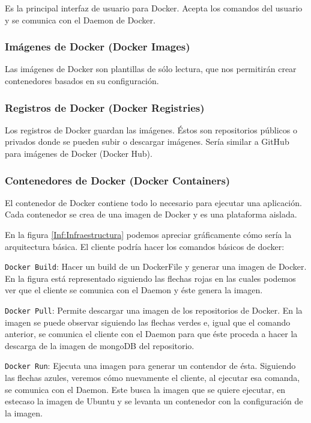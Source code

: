 Es la principal interfaz de usuario para Docker. Acepta los comandos del usuario y se
comunica con el Daemon de Docker.

\subsubsection{Imágenes de Docker (Docker Images)}

Las imágenes de Docker son plantillas de sólo lectura, que nos permitirán crear contenedores basados en su configuración.

\subsubsection{Registros de Docker (Docker Registries)}

Los registros de Docker guardan las imágenes. Éstos son repositorios públicos o privados donde se pueden subir o descargar imágenes. Sería similar a GitHub para imágenes de Docker (Docker Hub).

\subsubsection{Contenedores de Docker (Docker Containers)}

El contenedor de Docker contiene todo lo necesario para ejecutar una aplicación. Cada contenedor se crea de una imagen de Docker y es una plataforma aislada.
\newline

En la figura \ref{Inf:Infraestructura} podemos apreciar gráficamente cómo sería la arquitectura básica. El cliente podría hacer los comandos básicos de docker:

\texttt{Docker Build}: Hacer un build de un DockerFile y generar una imagen de Docker. En la figura está representado siguiendo las flechas rojas en las cuales podemos ver que el cliente se comunica con el Daemon y éste genera la imagen.

\texttt{Docker Pull}: Permite descargar una imagen de los repositorios de Docker. En la imagen se puede observar siguiendo las flechas verdes e, igual que el comando anterior, se comunica el cliente con el Daemon para que éste proceda a hacer la descarga de la imagen de mongoDB del repositorio. 

\texttt{Docker Run}: Ejecuta una imagen para generar un contendor de ésta. Siguiendo las flechas azules, veremos cómo nuevamente el cliente, al ejecutar esa comanda, se comunica con el Daemon. Este busca la imagen que se quiere ejecutar, en estecaso la imagen de Ubuntu y se levanta un contenedor con la configuración de la imagen.

